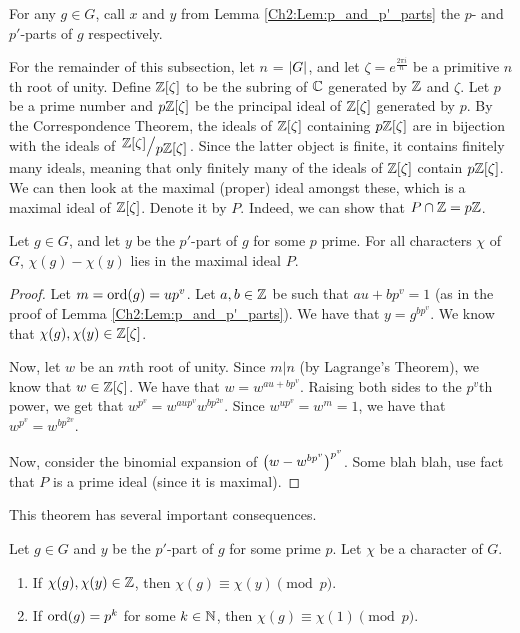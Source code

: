 \begin{boxdefinition}
    For any $g \in G$, call $x$ and $y$ from Lemma \ref{Ch2:Lem:p_and_p'_parts} the $p$- and $p'$-parts of $g$ respectively.
\end{boxdefinition}

For the remainder of this subsection, let $n$ = $\left\lvert G \right\rvert$, and let $\zeta = e^{\frac{2\pi i}{n}}$ be a primitive $n$th root of unity. Define $\mathbb{Z}[\zeta]$ to be the subring of $\mathbb{C}$ generated by $\mathbb{Z}$ and $\zeta$. Let $p$ be a prime number and $p\mathbb{Z}[\zeta]$ be the principal ideal of $\mathbb{Z}[\zeta]$ generated by $p$. By the Correspondence Theorem, the ideals of $\mathbb{Z}[\zeta]$ containing $p\mathbb{Z}[\zeta]$ are in bijection with the ideals of $\quotient{\Z[\zeta]}{p\Z[\zeta]}$. Since the latter object is finite, it contains finitely many ideals, meaning that only finitely many of the ideals of $\mathbb{Z}[\zeta]$ contain $p\mathbb{Z}[\zeta]$. We can then look at the maximal (proper) ideal amongst these, which is a maximal ideal of $\mathbb{Z}[\zeta]$. Denote it by $P$. Indeed, we can show that $P \cap \mathbb{Z} = p\mathbb{Z}$.

\begin{theorem}
    Let $g \in G$, and let $y$ be the $p'$-part of $g$ for some $p$ prime. For all characters $\chi$ of $G$, $\chi(g) - \chi(y)$ lies in the maximal ideal $P$.
\end{theorem}
\begin{proof}
    Let $m = \operatorname{ord}\!\left( g \right) = u p^v$. Let $a,b \in \mathbb{Z}$ be such that $au + b p^v = 1$ (as in the proof of Lemma \ref{Ch2:Lem:p_and_p'_parts}). We have that $y = g^{bp^v}$. We know that $\chi(g), \chi(y) \in \mathbb{Z}[\zeta]$.

    Now, let $w$ be an $m$th root of unity. Since $m \vert n$ (by Lagrange's Theorem), we know that $w \in \mathbb{Z}[\zeta]$. We have that $w = w^{au + bp^v}$. Raising both sides to the $p^v$th power, we get that $w^{p^v} = w^{aup^v} w^{bp^{2v}}$. Since $w^{up^v} = w^m = 1$, we have that $w^{p^v} = w^{bp^{2v}}$.

    Now, consider the binomial expansion of $\left( w - w^{bp^v} \right)^{p^v}$. Some blah blah, use fact that $P$ is a prime ideal (since it is maximal). %
\end{proof}

This theorem has several important consequences.

\begin{corollary}
    Let $g \in G$ and $y$ be the $p'$-part of $g$ for some prime $p$. Let $\chi$ be a character of $G$.
    \begin{enumerate}[label = \normalfont \arabic*., noitemsep]
        \item If $\chi(g), \chi(y) \in \mathbb{Z}$, then $\chi(g) \equiv \chi(y) \pmod{p}$.
        \item If $\operatorname{ord}\!\left( g \right) = p^k$ for some $k \in \mathbb{N}$, then $\chi(g) \equiv \chi(1) \pmod{p}$.
    \end{enumerate}
\end{corollary}

